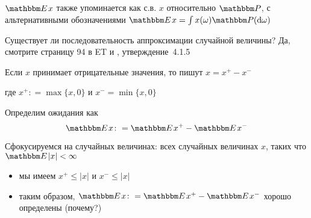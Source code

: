 \begin{frame}
    
    \vspace{2em}
    $\EE x$ также упоминается как
     с.в. $x$ относительно $\PP$, с альтернативными обозначениями
        $\EE x = \int x(\omega) \PP(\diff \omega)$
    
    \vspace{1em}
    Существует ли последовательность аппроксимации случайной величины? 
    Да, смотрите страницу 94 в ET и \cite{dudley2002real}, утверждение~4.1.5
    
\end{frame}

\begin{frame}

    \vspace{2em}
    Если $x$ принимает отрицательные значения, то пишут $x = x^{+} - x^{-}$
    
   где $x^{+}\colon = \max\{x,0\}$ и $x^{-} = \min\{x,0\}$
    
    Определим ожидания как
    \begin{equation*}
        \EE x \colon = \EE x^{+} - \EE x^{-}
    \end{equation*}

    \vspace{.7em}
    Сфокусируемся на  случайных величинах: всех случайных 
    величинах $x$, таких что $\EE |x| < \infty$
    \begin{itemize}
        \item мы имеем $x^+ \leq |x|$ и $x^-
            \leq |x|$
        \item таким образом, $\EE x \colon = \EE x^{+} - \EE x^{-}$ хорошо определены 
        (почему?)
    \end{itemize}
    
\end{frame}

